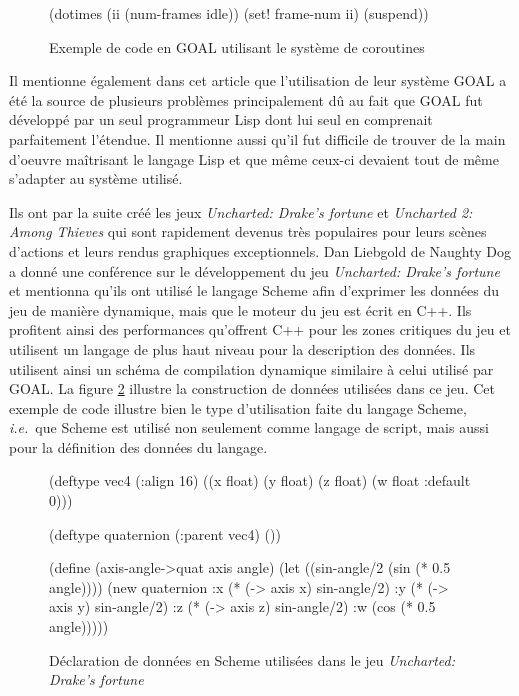\documentclass[12pt,twoside,letterpaper,francais]{book}
\newcommand{\ie}{{\textit{i.e.}~}}
\begin{document}
\begin{figure}[htb!]
  \begin{schemecode}
(dotimes (ii (num-frames idle))
  (set! frame-num ii)
  (suspend))
  \end{schemecode}
  \caption{Exemple de code en GOAL utilisant le système de coroutines}
  \label{Rev:goal}
\end{figure}

Il mentionne également dans cet article que l'utilisation de leur
système GOAL a été la source de plusieurs problèmes principalement dû
au fait que GOAL fut développé par un seul programmeur Lisp dont lui
seul en comprenait parfaitement l'étendue. Il mentionne aussi qu'il
fut difficile de trouver de la main d'oeuvre maîtrisant le langage
Lisp et que même ceux-ci devaient tout de même s'adapter au système
utilisé.

Ils ont par la suite créé les jeux \textit{Uncharted: Drake's fortune}
et \textit{Uncharted 2: Among Thieves} qui sont rapidement devenus
très populaires pour leurs scènes d'actions et leurs rendus graphiques
exceptionnels. Dan Liebgold de Naughty Dog a donné une conférence sur
le dévelop\-pement du jeu \textit{Uncharted: Drake's
  fortune}~\cite{ND_DRAKE} et mentionna qu'ils ont utilisé le langage
Scheme afin d'exprimer les données du jeu de manière dynamique, mais
que le moteur du jeu est écrit en C++. Ils profitent ainsi des
performances qu'offrent C++ pour les zones critiques du jeu et
utilisent un langage de plus haut niveau pour la description des
données. Ils utilisent ainsi un schéma de compilation dynamique
similaire à celui utilisé par GOAL. La figure \ref{Rev:Drake} illustre
la construction de données utilisées dans ce jeu. Cet exemple de code
illustre bien le type d'utilisation faite du langage Scheme, \ie que
Scheme est utilisé non seulement comme langage de script, mais aussi
pour la définition des données du langage.\\

\begin{figure}[htb!]
  \begin{schemecode}
(deftype vec4 (:align 16)
  ((x float) (y float)
   (z float) (w float :default 0)))

(deftype quaternion (:parent vec4) ())

(define (axis-angle->quat axis angle)
 (let ((sin-angle/2 (sin (* 0.5 angle))))
  (new quaternion
       :x (* (-> axis x) sin-angle/2)
       :y (* (-> axis y) sin-angle/2)
       :z (* (-> axis z) sin-angle/2)
       :w (cos (* 0.5 angle)))))
  \end{schemecode}
  \caption{Déclaration de données en Scheme utilisées dans le jeu
    \textit{Uncharted: Drake's fortune}~\cite{ND_DRAKE}}
  \label{Rev:Drake}
\end{figure}
\end{document}
